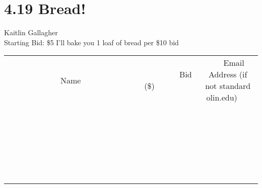 \documentclass[11pt]{article}
\begin{document}
\section*{4.19 Bread!}
Kaitlin Gallagher
\\
Starting Bid: \$5
\newline
I'll bake you 1 loaf of bread per \$10 bid
\\[6ex]
\begin{tabular}{c c c}
~~~~~~~~~~~~~Name~~~~~~~~~~~~~ & ~~~~~~~~~Bid (\$)~~~~~~~~~  & ~~~Email Address (if not standard olin.edu)~~~\\
 & & \\
\hline
 & & \\
\hline
 & & \\
\hline
 & & \\
\hline
 & & \\
\hline
 & & \\
\hline
 & & \\
\hline
 & & \\
\hline
 & & \\
\hline
 & & \\
\hline
 & & \\
\hline
 & & \\
\hline
 & & \\
\hline
 & & \\
\hline
 & & \\
\hline
 & & \\
\hline
 & & \\
\hline
 & & \\
\hline
 & & \\
\hline
 & & \\
\hline
 & & \\
\hline
 & & \\
\hline
 & & \\
\hline
 & & \\
\hline
 & & \\
\hline
 & & \\
\hline
\end{tabular}
\newpage
\end{document}
